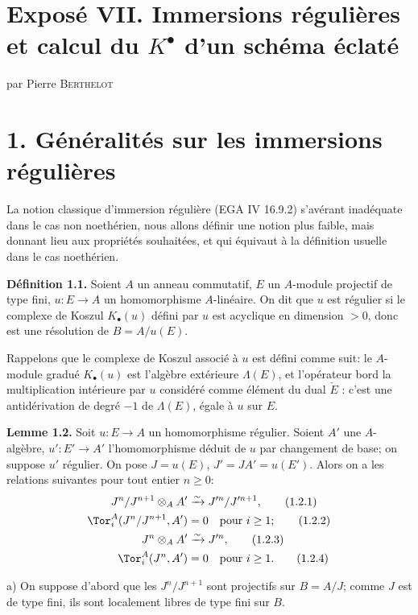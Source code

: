 \renewcommand{\Sym}{\operatorname{Sym}}
\renewcommand{\Projz}{\operatorname{Proj}_0}
\section*{Exposé VII. Immersions régulières et calcul du \texorpdfstring{$K^{\bullet}$}{K0} d'un schéma éclaté}
\begin{center}
par Pierre \textsc{Berthelot}
\end{center}

\section*{1. Généralités sur les immersions régulières}

La notion classique d'immersion régulière (EGA IV 16.9.2) s'avérant inadéquate dans le cas non noethérien, nous allons définir une notion plus faible, mais donnant lieu aux propriétés souhaitées, et qui équivaut à la définition usuelle dans le cas noethérien.

\textbf{Définition 1.1.} Soient $A$ un anneau commutatif, $E$ un $A$-module projectif de type fini, $u:E\longrightarrow A$ un homomorphisme $A$-linéaire. On dit que $u$ est régulier si le complexe de Koszul $K_\bullet(u)$ défini par $u$ est acyclique en dimension $>0$, donc est une résolution de $B=A/u(E)$.

Rappelons que le complexe de Koszul associé à $u$ est défini comme suit: le $A$-module gradué $K_\bullet(u)$ est l'algèbre extérieure $\Lambda(E)$, et l'opérateur bord la multiplication intérieure par $u$ considéré comme élément du dual $\check E$ : c'est une antidérivation de degré $-1$ de $\Lambda(E)$, égale à $u$ sur $E$.

\textbf{Lemme 1.2.} Soit $u:E\longrightarrow A$ un homomorphisme régulier. Soient $A'$ une $A$-algèbre, $u':E'\longrightarrow A'$ l'homomorphisme déduit de $u$ par changement de base; on suppose $u'$ régulier. On pose $J=u(E)$, $J'=JA'=u(E')$. Alors on a les relations suivantes pour tout entier $n\geq0$:
\begin{align}
 J^n/J^{n+1}\otimes_AA'&\xrightarrow{\sim}J'^n/J'^{n+1}, \tag{1.2.1}\\
 \Tor_i^A(J^n/J^{n+1},A')&=0\quad\text{pour }i\geq1; \tag{1.2.2}\\
 J^n\otimes_AA'&\xrightarrow{\sim}J'^n, \tag{1.2.3}\\
 \Tor_i^A(J^n,A')&=0\quad\text{pour }i\geq1. \tag{1.2.4}
\end{align}

a) On suppose d'abord que les $J^n/J^{n+1}$ sont projectifs sur $B=A/J$; comme $J$ est de type fini, ils sont localement libres de type fini sur $B$.
